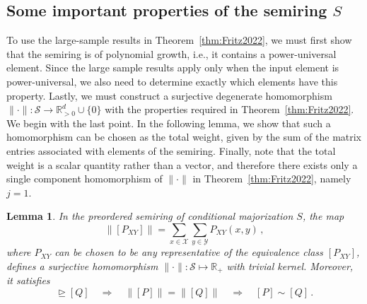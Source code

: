 \documentclass[aps,pra,11pt,onecolumn,nofootinbib,tightenlines]{revtex4-2}
\newtheorem{lemma}[theorem]{Lemma}
\theoremstyle{definition}
\newcommand{\cS}{\mathcal{S}}
\newcommand{\R}{\mathbb{R}}
\newcommand{\mc}[1]{\mathcal{#1}}
\newcommand{\rgeq}{\trianglerighteq}
\begin{document}
\subsection{Some important properties of the semiring $S$}
To use the large-sample results in Theorem~\ref{thm:Fritz2022}, we must first show that the semiring is of polynomial growth, i.e., it contains a power-universal element. Since the large sample results apply only when the input element is power-universal, we also need to determine exactly which elements have this property. Lastly, we must construct a surjective degenerate homomorphism $\|\cdot\|:\cS\to\R_{>0}^d\cup\{0\}$ with the properties required in Theorem~\ref{thm:Fritz2022}. We begin with the last point. In the following lemma, we show that such a homomorphism can be chosen as the total weight, given by the sum of the matrix entries associated with elements of the semiring.
Finally, note that the total weight is a scalar quantity rather than a vector, and therefore there exists only a single component homomorphism of \(\|\cdot\|\) in Theorem~\ref{thm:Fritz2022}, namely \(j = 1\).
\begin{lemma}
\label{lem: degenerate and zig-zag}
In the preordered semiring of conditional majorization $S$, the map
\begin{equation}
\|[P_{XY}]\| = \sum_{x\in\mc X}\sum_{y\in\mc Y} P_{XY}(x,y) \,,
\end{equation}
where $P_{XY}$ can be chosen to be any representative of the equivalence class $[P_{XY}]$,
defines a surjective homomorphism $\|\cdot\| : \cS \mapsto \mathbb{R}_+$ with trivial kernel. Moreover, it satisfies
\begin{equation}
[P] \rgeq [Q] \quad \Rightarrow \quad \|[P]\| = \|[Q]\| \quad \Rightarrow\quad  [P] \sim [Q]\,.
\end{equation}
\end{lemma}
\end{document}
